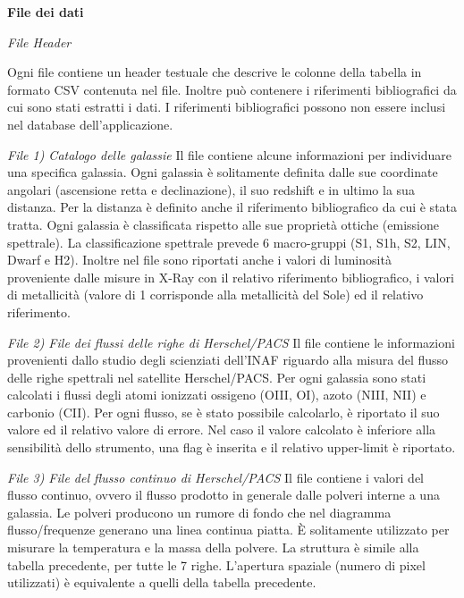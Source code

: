 \documentclass[12pt,a4paper,onecolumn,x11names]{article}
\begin{document}
\begin{flushleft}
		\textbf{File dei dati}\newline
		
		\textit{File Header}\newline
		
		Ogni file contiene un header testuale che descrive le colonne della tabella in formato CSV contenuta nel file. Inoltre può contenere i riferimenti bibliografici da cui sono stati estratti i dati. I riferimenti bibliografici possono non essere inclusi nel database dell’applicazione.
		\newline
		
		\textit{File 1) Catalogo delle galassie}\newline
		Il file contiene alcune informazioni per individuare una specifica galassia.
		Ogni galassia è solitamente definita dalle sue coordinate angolari (ascensione retta e declinazione), il suo redshift e in ultimo la sua distanza. Per la distanza è definito anche il riferimento bibliografico da cui è stata tratta.\newline
		Ogni galassia è classificata rispetto alle sue proprietà ottiche (emissione spettrale). La classificazione spettrale prevede 6 macro-gruppi (S1, S1h, S2, LIN, Dwarf e H2). Inoltre nel file sono riportati anche i valori di luminosità proveniente dalle misure in X-Ray con il relativo riferimento bibliografico, i valori di metallicità (valore di 1 corrisponde alla metallicità del Sole) ed il relativo riferimento.\newline
		
		\textit{File 2) File dei flussi delle righe di Herschel/PACS}\newline
		Il file contiene le informazioni provenienti dallo studio degli scienziati dell’INAF riguardo alla misura del flusso delle righe spettrali nel satellite Herschel/PACS. Per ogni galassia sono stati calcolati i flussi degli atomi ionizzati ossigeno (OIII, OI), azoto (NIII, NII) e carbonio (CII). Per ogni flusso, se è stato possibile calcolarlo, è riportato il suo valore ed il relativo valore di errore.\newline
		Nel caso il valore calcolato è inferiore alla sensibilità dello strumento, una flag è inserita e il relativo upper-limit è riportato.\newline
		
		\textit{File 3) File del flusso continuo di Herschel/PACS}\newline
		Il file contiene i valori del flusso continuo, ovvero il flusso prodotto in generale dalle polveri interne a una galassia. Le polveri producono un rumore di fondo che nel diagramma flusso/frequenze generano una linea continua piatta. È solitamente utilizzato per misurare la temperatura e la massa della polvere. La struttura è simile alla tabella precedente, per tutte le 7 righe. L’apertura spaziale (numero di pixel utilizzati) è equivalente a quelli della tabella precedente.\newline
		

\end{flushleft}
\end{document}

